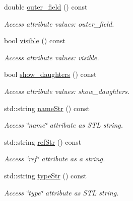 \begin{DoxyCompactItemize}
double \hyperlink{struct_d_d4hep_1_1_x_m_l_1_1_child_value_ad9fe2f7f8dc5389e23da5f129c7028ee}{outer\_\-field} () const 
\begin{DoxyCompactList}\small\item\em Access attribute values: outer\_\-field. \item\end{DoxyCompactList}\item 
bool \hyperlink{struct_d_d4hep_1_1_x_m_l_1_1_child_value_a3bebeae6e105f3dfd8e378aaaec5d6eb}{visible} () const 
\begin{DoxyCompactList}\small\item\em Access attribute values: visible. \item\end{DoxyCompactList}\item 
bool \hyperlink{struct_d_d4hep_1_1_x_m_l_1_1_child_value_ad970503872bffcc979c57b9faa5b8da5}{show\_\-daughters} () const 
\begin{DoxyCompactList}\small\item\em Access attribute values: show\_\-daughters. \item\end{DoxyCompactList}\item 
std::string \hyperlink{struct_d_d4hep_1_1_x_m_l_1_1_child_value_a67aa53d0e2844326d235d213f1a5c266}{nameStr} () const 
\begin{DoxyCompactList}\small\item\em Access \char`\"{}name\char`\"{} attribute as STL string. \item\end{DoxyCompactList}\item 
std::string \hyperlink{struct_d_d4hep_1_1_x_m_l_1_1_child_value_a8b2db1484aa244a2b516e0513e265462}{refStr} () const 
\begin{DoxyCompactList}\small\item\em Access \char`\"{}ref\char`\"{} attribute as a string. \item\end{DoxyCompactList}\item 
std::string \hyperlink{struct_d_d4hep_1_1_x_m_l_1_1_child_value_abb3c6a8a0a2bf4707708900657440d73}{typeStr} () const 
\begin{DoxyCompactList}\small\item\em Access \char`\"{}type\char`\"{} attribute as STL string. \item\end{DoxyCompactList}\item 

\end{DoxyCompactItemize}
